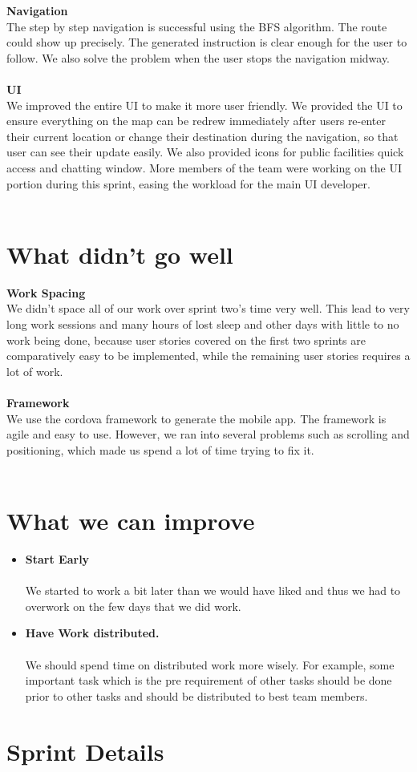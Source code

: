 \documentclass[12pt]{article}
\begin{document}
\textbf{Navigation}\\ The step by step navigation is successful using the BFS algorithm. The route could show up precisely. The generated instruction is clear enough for the user to follow. We also solve the problem when the user stops the navigation midway. \\ \\

\textbf{UI} \\ We improved the entire UI to make it more user friendly.  We provided the UI to ensure everything on the map can be redrew immediately after users re-enter their current location or change their destination during the navigation, so that user can see their update easily. We also provided icons for public facilities quick access and chatting window. More members of the team were working on the UI portion during this sprint, easing the workload for the main UI developer. \\ \\


\section{What didn't go well}

\textbf{Work Spacing}\\
We didn't space all of our work over sprint two's time very well. This lead to very long work sessions and many hours of lost sleep and other days with little to no work being done, because user stories covered on the first two sprints are comparatively easy to be implemented, while the remaining user stories requires a lot of work. \\ \\

\textbf{Framework}\\
We use the cordova framework to generate the mobile app. The framework is agile and easy to use. However, we ran into several problems such as scrolling and positioning, which made us spend a lot of time trying to fix it. \\ \\

\section{What we can improve}
\begin{itemize}
\item \textbf{Start Early} \\ \\
We started to work a bit later than we would have liked and thus we had to overwork on the few days that we did work. 

\item \textbf{Have Work distributed.} \\ \\
We should spend time on distributed work more wisely. For example, some important task which is the pre requirement of other tasks should be done prior to other tasks and should be distributed to best team members.

\end{itemize}

\section{Sprint Details}

\end{document}
